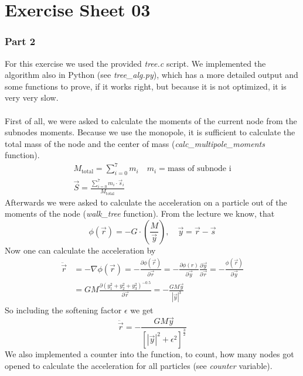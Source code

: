 \documentclass{scrartcl}
\begin{document}
	
	\part*{Exercise Sheet 03}	
	\section*{Part 2}
	For this exercise we used the provided \emph{tree.c} script. We implemented the algorithm also in Python (see \emph{tree\_alg.py}), which has a more detailed output and some functions to prove, if it works right, but because it is not optimized, it is very very slow.\\
	\\
	First of all, we were asked to calculate the moments of the current node from the subnodes moments. Because we use the monopole, it is sufficient to calculate the total mass of the node and the center of mass (\emph{calc\_multipole\_moments} function).\\
	\begin{align}
		M_\text{total} = \sum_{i = 0}^{7} m_i \quad m_i = \text{mass of subnode i}\\
		\vec{S} = \frac{\sum_{i = 0}^{7} m_i \cdot \vec{s}_i}{M_\text{total}}
	\end{align}
	Afterwards we were asked to calculate the acceleration on a particle out of the moments of the node (\emph{walk\_tree} function). From the lecture we know, that 
	\begin{equation}
		\phi(\vec{r}) = -G \cdot \left(\frac{M}{\vec{y}}\right), \quad \vec{y} = \vec{r} - \vec{s}
	\end{equation}
	Now one can calculate the acceleration by
	\begin{align}
		\ddot{\vec{r}} &= -\nabla \phi(\vec{r}) = - \frac{\partial \phi(\vec{r})}{\partial \vec{r}} = - \frac{\partial \phi (r)}{\partial \vec{y}} \frac{\partial\vec{y}}{\partial\vec{r}} = -\frac{\phi(\vec{r})}{\partial\vec{y}}\\
		&= G M \frac{\partial \left( y_1^2 + y_2^2 + y_3^2 \right)^{-0.5}}{\partial \vec{r}} = - \frac{G M \vec{y}}{| \vec{y} |^3}
	\end{align}
	So including the softening factor $\epsilon$ we get
	\begin{equation}
		\ddot{\vec{r}} = - \frac{G M \vec{y}}{[|\vec{y}|^2 + \epsilon^2]^\frac{3}{2}}
	\end{equation}
	We also implemented a counter into the function, to count, how many nodes got opened to calculate the acceleration for all particles (see \emph{counter} variable).\\
\end{document}
